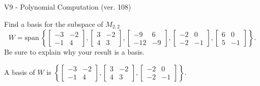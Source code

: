 \begin{exercise}
  \begin{exerciseTitle}V9 - Polynomial Computation (ver. 108)\end{exerciseTitle}
  \begin{exerciseStatement}
    Find a basis for the subspace of \(M_{2,2}\) 
\[W=\mathrm{span}\ \left\{\left[\begin{array}{cc}
-3 & -2 \\
-1 & 4
\end{array}\right] , \left[\begin{array}{cc}
3 & -2 \\
4 & 3
\end{array}\right] , \left[\begin{array}{cc}
-9 & 6 \\
-12 & -9
\end{array}\right] , \left[\begin{array}{cc}
-2 & 0 \\
-2 & -1
\end{array}\right] , \left[\begin{array}{cc}
6 & 0 \\
5 & -1
\end{array}\right]\right\}.\]
 Be sure to explain why your result is a basis.


  \end{exerciseStatement}
  \begin{exerciseAnswer}
   A basis of \(W\) is  \(\left\{\left[\begin{array}{cc}
-3 & -2 \\
-1 & 4
\end{array}\right] , \left[\begin{array}{cc}
3 & -2 \\
4 & 3
\end{array}\right] , \left[\begin{array}{cc}
-2 & 0 \\
-2 & -1
\end{array}\right]\right\}\).
  


  \end{exerciseAnswer}
\end{exercise}